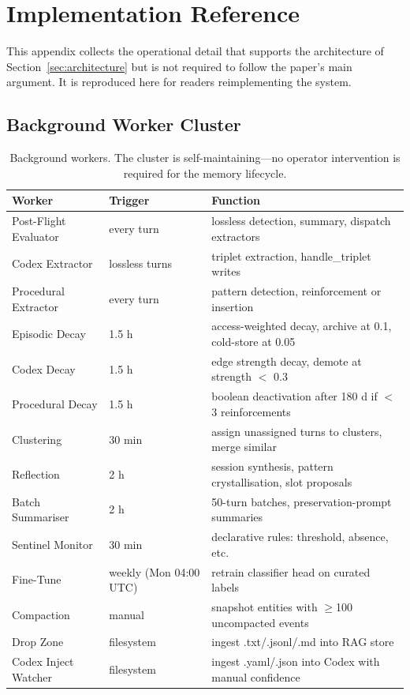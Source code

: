\documentclass[10pt]{article}
\begin{document}
\appendix
\section{Implementation Reference}
\label{app:implementation}

This appendix collects the operational detail that supports the architecture of Section~\ref{sec:architecture} but is not required to follow the paper's main argument. It is reproduced here for readers reimplementing the system.

\subsection{Background Worker Cluster}
\label{app:workers}

\begin{table}[htbp]
\centering
\small
\caption{Background workers. The cluster is self-maintaining---no operator intervention is required for the memory lifecycle.}
\label{tab:workers}
\begin{tabular}{@{}L{3.2cm}L{2.6cm}L{7cm}@{}}
\toprule
\textbf{Worker} & \textbf{Trigger} & \textbf{Function} \\
\midrule
Post-Flight Evaluator & every turn & lossless detection, summary, dispatch extractors \\
Codex Extractor      & lossless turns  & triplet extraction, handle\_triplet writes \\
Procedural Extractor  & every turn      & pattern detection, reinforcement or insertion \\
Episodic Decay        & 1.5 h           & access-weighted decay, archive at 0.1, cold-store at 0.05 \\
Codex Decay           & 1.5 h           & edge strength decay, demote at strength $<$ 0.3 \\
Procedural Decay      & 1.5 h           & boolean deactivation after 180 d if $<$ 3 reinforcements \\
Clustering            & 30 min          & assign unassigned turns to clusters, merge similar \\
Reflection            & 2 h             & session synthesis, pattern crystallisation, slot proposals \\
Batch Summariser      & 2 h             & 50-turn batches, preservation-prompt summaries \\
Sentinel Monitor      & 30 min          & declarative rules: threshold, absence, etc. \\
Fine-Tune             & weekly (Mon 04:00 UTC) & retrain classifier head on curated labels \\
Compaction            & manual          & snapshot entities with $\geq$100 uncompacted events \\
Drop Zone             & filesystem      & ingest .txt/.jsonl/.md into RAG store \\
Codex Inject Watcher  & filesystem      & ingest .yaml/.json into Codex with manual confidence \\
\bottomrule
\end{tabular}
\end{table}
\end{document}
